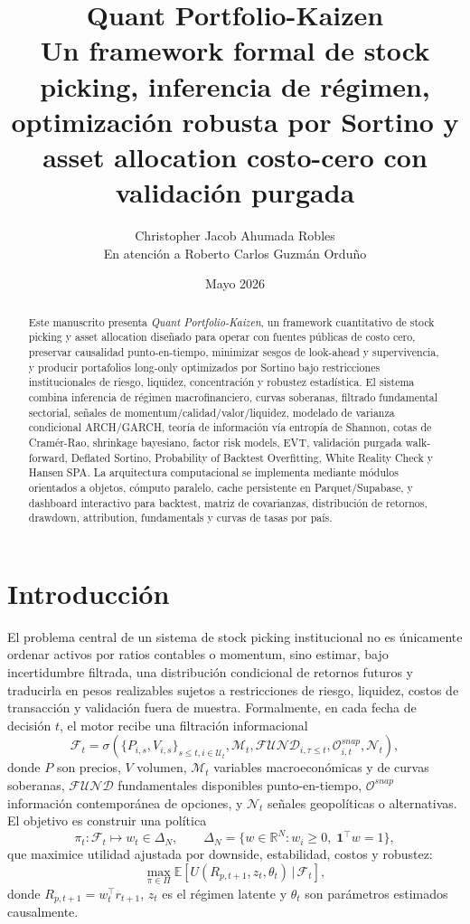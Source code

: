 \documentclass[11pt,letterpaper]{article}
\title{\textbf{Quant Portfolio-Kaizen}\\
\large Un framework formal de stock picking, inferencia de régimen, optimización robusta por Sortino y asset allocation costo-cero con validación purgada}
\author{Christopher Jacob Ahumada Robles\\
\small En atención a Roberto Carlos Guzmán Orduño}
\date{Mayo 2026}
\newcommand{\R}{\mathbb{R}}
\newcommand{\E}{\mathbb{E}}
\newcommand{\F}{\mathcal{F}}
\newcommand{\1}{\mathbf{1}}
\newcommand{\given}{\,|\,}
\begin{document}
\maketitle

\begin{abstract}
Este manuscrito presenta \emph{Quant Portfolio-Kaizen}, un framework cuantitativo de stock picking y asset allocation diseñado para operar con fuentes públicas de costo cero, preservar causalidad punto-en-tiempo, minimizar sesgos de look-ahead y supervivencia, y producir portafolios long-only optimizados por Sortino bajo restricciones institucionales de riesgo, liquidez, concentración y robustez estadística. El sistema combina inferencia de régimen macrofinanciero, curvas soberanas, filtrado fundamental sectorial, señales de momentum/calidad/valor/liquidez, modelado de varianza condicional ARCH/GARCH, teoría de información vía entropía de Shannon, cotas de Cramér-Rao, shrinkage bayesiano, factor risk models, EVT, validación purgada walk-forward, Deflated Sortino, Probability of Backtest Overfitting, White Reality Check y Hansen SPA. La arquitectura computacional se implementa mediante módulos orientados a objetos, cómputo paralelo, cache persistente en Parquet/Supabase, y dashboard interactivo para backtest, matriz de covarianzas, distribución de retornos, drawdown, attribution, fundamentals y curvas de tasas por país.
\end{abstract}

\tableofcontents
\newpage

\section{Introducción}

El problema central de un sistema de stock picking institucional no es únicamente ordenar activos por ratios contables o momentum, sino estimar, bajo incertidumbre filtrada, una distribución condicional de retornos futuros y traducirla en pesos realizables sujetos a restricciones de riesgo, liquidez, costos de transacción y validación fuera de muestra. Formalmente, en cada fecha de decisión \(t\), el motor recibe una filtración informacional
\[
    \F_t =
    \sigma\left(
        \{P_{i,s}, V_{i,s}\}_{s\leq t,i\in\mathcal{U}_t},
        \mathcal{M}_t,
        \mathcal{FUND}_{i,\tau \leq t},
        \mathcal{O}_{i,t}^{snap},
        \mathcal{N}_t
    \right),
\]
donde \(P\) son precios, \(V\) volumen, \(\mathcal{M}_t\) variables macroeconómicas y de curvas soberanas, \(\mathcal{FUND}\) fundamentales disponibles punto-en-tiempo, \(\mathcal{O}^{snap}\) información contemporánea de opciones, y \(\mathcal{N}_t\) señales geopolíticas o alternativas. El objetivo es construir una política
\[
    \pi_t: \F_t \mapsto w_t \in \Delta_N,
    \qquad
    \Delta_N = \{w\in\R^N: w_i\ge 0,\; \mathbf{1}^{\top}w=1\},
\]
que maximice utilidad ajustada por downside, estabilidad, costos y robustez:
\[
    \max_{\pi\in\Pi}
    \E\left[
        U(R_{p,t+1},z_t,\theta_t)
        \given \F_t
    \right],
\]
donde \(R_{p,t+1}=w_t^\top r_{t+1}\), \(z_t\) es el régimen latente y \(\theta_t\) son parámetros estimados causalmente.
\end{document}
